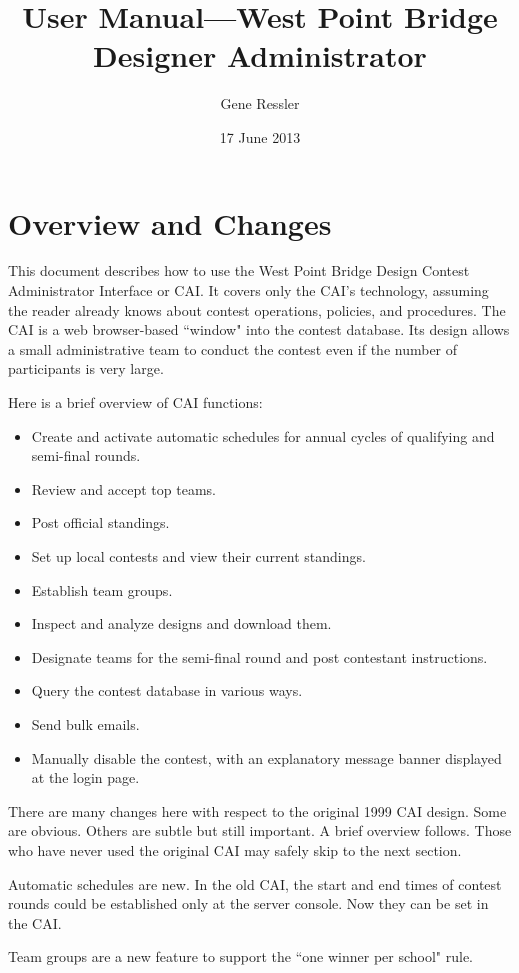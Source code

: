 \documentclass[11pt,letterpaper]{refart}
\title{User Manual---West Point Bridge Designer Administrator}
\author{Gene Ressler}
\date{17 June 2013}
\begin{document}
\maketitle
\tableofcontents\newpage

\section{Overview and Changes}
This document describes how to use the West Point Bridge Design Contest Administrator
Interface or CAI. It covers only the CAI's technology, assuming the reader already knows
about contest operations, policies, and procedures. The CAI is a web browser-based 
``window" into the contest database.  Its design allows a small administrative
team to conduct the contest even if the number of participants is very large. 

Here is a brief overview of CAI functions:
\begin{itemize}
\item Create and activate automatic schedules for annual cycles of qualifying and semi-final rounds.
\item Review and accept top teams.
\item Post official standings.
\item Set up local contests and view their current standings.
\item Establish team groups.
\item Inspect and analyze designs and download them.
\item Designate teams for the semi-final round and post contestant instructions.
\item Query the contest database in various ways.
\item Send bulk emails.
\item Manually disable the contest, with an explanatory message banner displayed at
 the login page.
\end{itemize}
There are many changes here with respect to the original 1999 CAI design. Some are
obvious.  Others are subtle but still important. A brief overview follows.  Those who
have never used the original CAI may safely skip to the next section.

Automatic schedules are new.  In the old CAI, the start and end times of contest 
rounds could be established only at the server console. Now they can be 
set in the CAI. 

Team groups are a new feature to support the 
``one winner per school" rule. 
\end{document}
